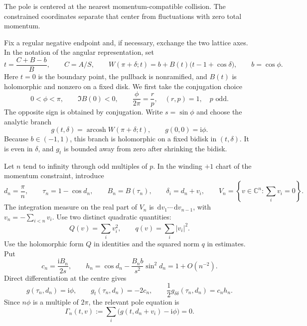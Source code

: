 \documentclass[11pt]{article}
\numberwithin{equation}{section}
\theoremstyle{definition}
\newcommand{\C}{\mathbb C}
\newcommand{\dd}{\,\mathrm d}
\newcommand{\ii}{\mathrm i}
\begin{document}
The pole is centered at the nearest momentum-compatible collision.
The constrained coordinates separate that center from fluctuations with
zero total momentum.

Fix a regular negative endpoint and, if necessary, exchange the two lattice
axes.  In the notation of the angular representation, set
\begin{equation}
 t=\frac{C+B-b}{B},\qquad C=A/S,\qquad
 W(\pi+\delta;t)=b+B(t)\bigl(t-1+\cos\delta\bigr),
 \qquad b=\cos\phi.
 \label{eq:morse-coordinate}
\end{equation}
Here $t=0$ is the boundary point, the pullback is nonramified, and $B(t)$
is holomorphic and nonzero on a fixed disk.  We first take the conjugation
choice
\begin{equation}
 0<\phi<\pi,\qquad \Im B(0)<0,\qquad
 \frac{\phi}{2\pi}=\frac rp,\quad (r,p)=1,\quad p\text{ odd}.
 \label{eq:morse-rational-phase}
\end{equation}
The opposite sign is obtained by conjugation.  Write $s=\sin\phi$ and choose
the analytic branch
\begin{equation}
 g(t,\delta)=\operatorname{arcosh}W(\pi+\delta;t),
 \qquad g(0,0)=\ii\phi.
 \label{eq:morse-g}
\end{equation}
Because $b\in(-1,1)$, this branch is holomorphic on a fixed bidisk in
$(t,\delta)$.  It is even in $\delta$, and $g_t$ is bounded away from zero
after shrinking the bidisk.

Let $n$ tend to infinity through odd multiples of $p$.  In the winding
$+1$ chart of the momentum constraint, introduce
\begin{equation}
 d_n=\frac\pi n,\qquad \tau_n=1-\cos d_n,\qquad
 B_n=B(\tau_n),\qquad
 \delta_i=d_n+v_i,\qquad
 V_n=\left\{v\in\C^n:\sum_i v_i=0\right\}.
 \label{eq:morse-centre}
\end{equation}
The integration measure on the real part of $V_n$ is
$\dd v_1\cdots\dd v_{n-1}$, with $v_n=-\sum_{i<n}v_i$.
Use two distinct quadratic quantities:
\begin{equation}
 Q(v)=\sum_i v_i^2,\qquad q(v)=\sum_i|v_i|^2.
 \label{eq:morse-two-quadratics}
\end{equation}
Use the holomorphic form $Q$ in identities and the squared norm $q$
in estimates.
Put
\begin{equation}
 c_n=\frac{\ii B_n}{2s},\qquad
 h_n=\cos d_n-\frac{B_n b}{s^2}\sin^2d_n=1+O(n^{-2}).
 \label{eq:morse-h}
\end{equation}
Direct differentiation at the centre gives
\begin{equation}
 g(\tau_n,d_n)=\ii\phi,\qquad
 g_t(\tau_n,d_n)=-2c_n,\qquad
 \frac12g_{\delta\delta}(\tau_n,d_n)=c_nh_n.
 \label{eq:morse-centre-derivatives}
\end{equation}
Since $n\phi$ is a multiple of $2\pi$, the relevant pole equation is
\begin{equation}
 \Gamma_n(t,v):=\sum_i\bigl(g(t,d_n+v_i)-\ii\phi\bigr)=0.
 \label{eq:morse-pole-equation}
\end{equation}
\end{document}

